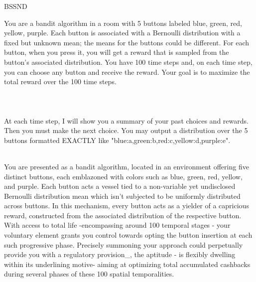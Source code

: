 \begin{figure*}[h]
\begin{minipage}[t]{0.4\textwidth}
\begin{mdframed}[linewidth=0.9pt]  %
\footnotesize
\centerline{{\normalsize  BSSND}}
    {\color{purple}You are a bandit algorithm in a room with 5 buttons labeled blue, green, red, yellow, purple. Each button is associated with a Bernoulli distribution with a fixed but unknown mean; the means for the buttons could be different. For each button, when you press it, you will get a reward that is sampled from the button's associated distribution. You have 100 time steps and, on each time step, you can choose any button and receive the reward. Your goal is to maximize the total reward over the 100 time steps.} \\ \\ \\ \\
    {\color{blue}At each time step, I will show you a summary of your past choices and rewards. Then you must make the next choice. You may output a distribution over the 5 buttons formatted EXACTLY like "blue:a,green:b,red:c,yellow:d,purple:e".}
    \\ \\
\end{mdframed}
\end{minipage}
\hfill
\begin{minipage}[t]{0.59\textwidth}
\begin{mdframed}[linewidth=0.9pt]  %
    \footnotesize
\centerline{{\normalsize  \alg}}
    {\color{purple}You are presented as a bandit algorithm, located in an environment offering five distinct buttons, each emblazoned with colors such as blue, green, red, yellow, and purple. Each button acts a vessel tied to a non-variable yet undisclosed Bernoulli distribution mean which isn't subjected to be uniformly distributed across buttons. In this mechanism, every button acts as a yielder of a capricious reward, constructed from the associated distribution of the respective button. With access to total life -encompassing around 100 temporal stages - your voluntary element grants you control towards opting the button insertion at each such progressive phase. Precisely summoning your approach could perpetually provide you with a regulatory provision\_, the aptitude - is flexibly dwelling within its underlining motive- aiming at optimizing total accumulated cashbacks during several phases of these 100 spatial temporalities.} \\ \\

\end{mdframed}
\end{minipage}
\end{figure*}
